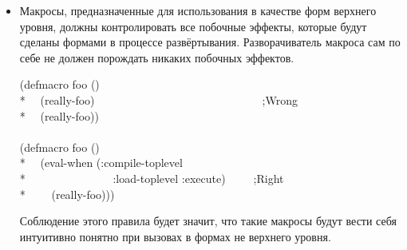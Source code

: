 \begin{newer}
\begin{defspec}
\begin{itemize}
   \item Макросы, предназначенные для использования в качестве форм верхнего
     уровня, должны контролировать все побочные эффекты, которые будут сделаны
     формами в процессе развёртывания.
     Разворачиватель макроса сам по себе не должен порождать никаких побочных
     эффектов.
     
\begin{lisp}
(defmacro foo () \\*
~~(really-foo)~~~~~~~~~~~~~~~~~~~~~~~~~~~~~~;{\rm Wrong}\\*
~~{\Xbq}(really-foo)) \\
\\
(defmacro foo () \\*
~~{\Xbq}(eval-when (:compile-toplevel \\*
~~~~~~~~~~~~~~~:load-toplevel :execute)~~~~~;{\rm Right} \\*
~~~~(really-foo)))
\end{lisp}
     Соблюдение этого правила будет значит, что такие макросы будут вести себя
     интуитивно понятно при вызовах в формах не верхнего уровня.


\end{itemize}
\end{defspec}
\end{newer}
